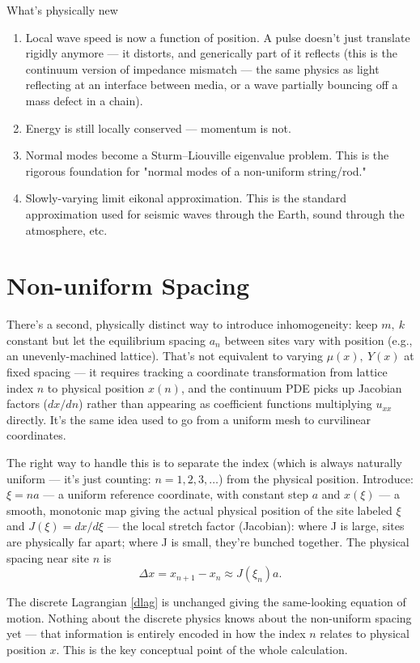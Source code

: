 What's physically new
\begin{enumerate}
  \item  Local wave speed is now a function of position. A pulse doesn't just translate rigidly anymore — it distorts, and generically part of it reflects  (this is the continuum version of impedance mismatch — the same physics as light reflecting at an interface between media, or a wave partially bouncing off a mass defect in a chain).
  \item  Energy is still locally conserved — momentum is not.
  \item  Normal modes become a Sturm–Liouville eigenvalue problem.
 This is the rigorous foundation for "normal modes of a non-uniform string/rod."
  \item Slowly-varying limit eikonal approximation. This is the standard approximation used for seismic waves through the Earth, sound through the atmosphere, etc.
\end{enumerate}
\section{Non-uniform Spacing}
There's a second, physically distinct way to introduce inhomogeneity: keep 
$m,\ k$ constant but let the equilibrium spacing $a_n$ 
  between sites vary with position (e.g., an unevenly-machined lattice). That's not equivalent to varying 
$\mu(x),\ Y(x)$ at fixed spacing — it requires tracking a coordinate transformation from lattice index $n$ to physical position $x(n)$, and the continuum PDE picks up Jacobian factors ($dx/dn$) rather than appearing as coefficient functions multiplying $u_{xx}$ directly. It's the same idea used to go from a uniform mesh to curvilinear coordinates.

The right way to handle this is to separate the index (which is always naturally uniform — it's just counting: $n=1,2,3,\ldots$) from the physical position. 
Introduce: $\xi=na$ — a uniform reference coordinate, with constant step $a$ and $x(\xi)$ — a smooth, monotonic map giving the actual physical position of the site labeled $\xi$
and $J(\xi)=dx/d \xi$ 
 — the local stretch factor (Jacobian): where 
J is large, sites are physically far apart; where 
J is small, they're bunched together.
The physical spacing near site $n$ is 
\[\Delta x=x_{n+1}-x_n \approx J(\xi_n) a. \]

The discrete Lagrangian \eqref{dlag} is unchanged 
giving the same-looking equation of motion. 
  Nothing about the discrete physics knows about the non-uniform spacing yet — that information is entirely encoded in how the index $n$ relates to physical position 
$x$. This is the key conceptual point of the whole calculation.


